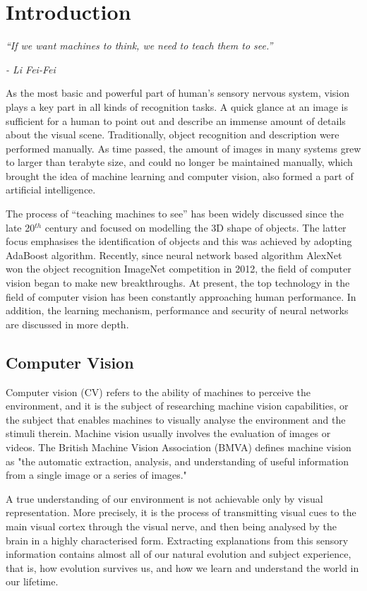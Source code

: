 \chapter{Introduction}
\label{cha:intro}

\epigraph{\textit{``If we want machines to think, we need to teach them to see.''}}{\textit{- Li Fei-Fei}}


As the most basic and powerful part of human's sensory nervous system, vision plays a key part in all kinds of recognition tasks. A quick glance at an image is sufficient for a human to point out and describe an immense amount of details about the visual scene. Traditionally, object recognition and description were performed manually. As time passed, the amount of images in many systems grew to larger than terabyte size, and could no longer be maintained manually, which brought the idea of machine learning and computer vision, also formed a part of artificial intelligence. 

The process of ``teaching machines to see'' has been widely discussed since the late 20$^{th}$ century and focused on modelling the 3D shape of objects. The latter focus emphasises the identification of objects and this was achieved by adopting AdaBoost \cite{adaboost} algorithm. Recently, since neural network based algorithm AlexNet \cite{alexnet} won the object recognition ImageNet \cite{imagenet} competition in 2012, the field of computer vision began to make new breakthroughs. At present, the top technology in the field of computer vision has been constantly approaching human performance. In addition, the learning mechanism, performance and security of neural networks are discussed in more depth.

\section{Computer Vision}

Computer vision (CV) refers to the ability of machines to perceive the environment, and it is the subject of researching machine vision capabilities, or the subject that enables machines to visually analyse the environment and the stimuli therein. Machine vision usually involves the evaluation of images or videos. The British Machine Vision Association (BMVA) defines machine vision as "the automatic extraction, analysis, and understanding of useful information from a single image or a series of images." \cite{bmva}

A true understanding of our environment is not achievable only by visual representation. More precisely, it is the process of transmitting visual cues to the main visual cortex through the visual nerve, and then being analysed by the brain in a highly characterised form. Extracting explanations from this sensory information contains almost all of our natural evolution and subject experience, that is, how evolution survives us, and how we learn and understand the world in our lifetime.

